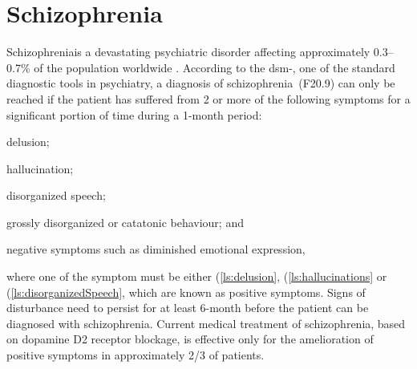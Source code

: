 \documentclass[12pt]{scrbook}
\newcommand{\rom}[1]{\uppercase\expandafter{\romannumeral #1\relax}}
\newcommand*{\scz}{schizophrenia}
\newcommand*{\Scz}{Schizophrenia}
\begin{document}
\section{\Scz}
\Scz is a devastating psychiatric disorder affecting approximately 0.3--0.7\% of the population worldwide \citep{dsm2013diagnostic}.
According to the \gls{dsm}-\rom{5}, one of the standard diagnostic tools in psychiatry, a diagnosis of \scz\ (F20.9) can only be reached if the patient has suffered from 2 or more of the following symptoms for a significant portion of time during a 1-month period: 
\begin{enumerate*}[label=\arabic*\upshape)]
	\item delusion; \label{ls:delusion}
	\item hallucination;\label{ls:hallucinations}
	\item disorganized speech;\label{ls:disorganizedSpeech}
	\item grossly disorganized or catatonic behaviour; and\label{ls:catatonicBehavior}
	\item negative symptoms such as diminished emotional expression,\label{ls:negativeSymptoms}
\end{enumerate*}  where one of the symptom must be either (\ref{ls:delusion}, (\ref{ls:hallucinations} or (\ref{ls:disorganizedSpeech}, which are known as positive symptoms.
Signs of disturbance need to persist for at least 6-month before the patient can be diagnosed with \scz.
Current medical treatment of \scz, based on dopamine D2 receptor blockage, is effective only for the amelioration of positive symptoms in approximately 2/3 of patients.
\end{document}
